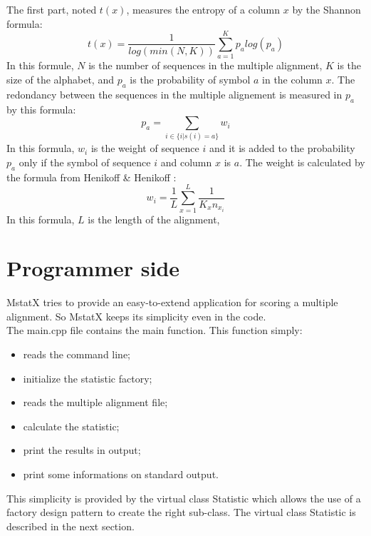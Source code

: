 \documentclass[12pt]{report}
\begin{document}
The first part, noted $t(x)$, measures the entropy of a column $x$ by the Shannon formula:
\begin{equation}
 t(x) = \frac{1}{log(min(N,K))}\sum_{a=1}^{K}p_a log(p_a)
\end{equation}
In this formule, $N$ is the number of sequences in the multiple alignment, $K$ is the size of the alphabet, and $p_a$ is the probability of symbol $a$ in the column $x$. The redondancy between the sequences in the multiple alignement is measured in $p_a$ by this formula:
\begin{equation}
	p_a = \sum_{i \in \{i|s(i) = a\}} w_i
\end{equation}
In this formula, $w_i$ is the weight of sequence $i$ and it is added to the probability $p_a$ only if the symbol of sequence $i$ and column $x$ is $a$. The weight is calculated by the formula from Henikoff \& Henikoff \cite{Henikoff-1994}:
\begin{equation}
	w_i = \frac{1}{L} \sum_{x=1}^{L}\frac{1}{K_x n_{x_i}}
\end{equation}
In this formula, $L$ is the length of the alignment, 

\newpage
\section{Programmer side}
\label{prog_sec}
MstatX tries to provide an easy-to-extend application for scoring a multiple alignment.
So MstatX keeps its simplicity even in the code.\\

The main.cpp file contains the main function. This function simply:
\begin{itemize}
\item reads the command line;
\item initialize the statistic factory;
\item reads the multiple alignment file;
\item calculate the statistic;
\item print the results in output;
\item print some informations on standard output.\\
\end{itemize}

This simplicity is provided by the virtual class Statistic which allows the use of a factory design pattern 
to create the right sub-class. The virtual class Statistic is described in the next section.
\end{document}
